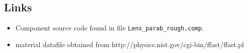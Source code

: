 \subsection*{Links}
\begin{itemize}
  \item Component source code found in file \texttt{Lens\_parab\_rough.comp}.
  \item material datafile obtained from http://physics.nist.gov/cgi-bin/ffast/ffast.pl
\end{itemize}
